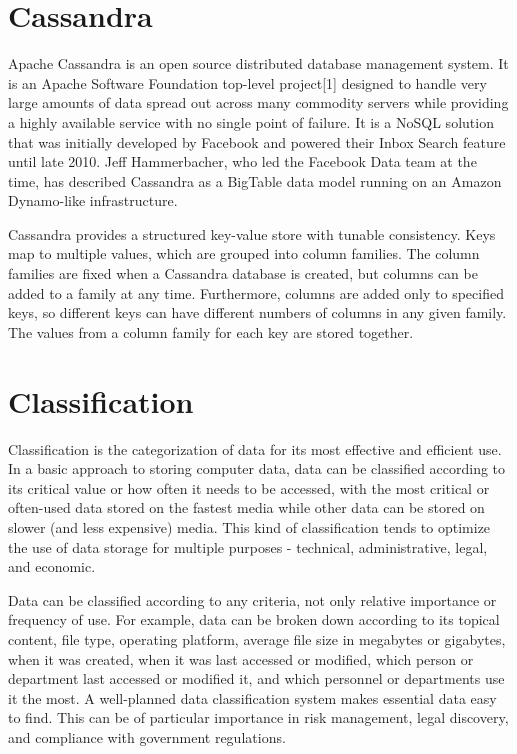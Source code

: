 \documentclass[11pt]{article} %
\begin{document}
\newpage


\newpage
\section{Cassandra}
Apache Cassandra is an open source distributed database management system. 
It is an Apache Software Foundation top-level project[1] designed to handle very 
large amounts of data spread out across many commodity servers while providing a highly 
available service with no single point of failure. It is a NoSQL solution that was initially 
developed by Facebook and powered their Inbox Search feature until late 2010.
Jeff Hammerbacher, who led the Facebook Data team at the time, has described 
Cassandra as a BigTable data model running on an Amazon Dynamo-like infrastructure.

Cassandra provides a structured key-value store with tunable consistency. 
Keys map to multiple values, which are grouped into column families. The column families are
 fixed when a Cassandra database is created, but columns can be added to a family at any time. 
Furthermore, columns are added only to specified keys, so different keys can have different 
numbers of columns in any given family. The values from a column family for each key are stored together.
\newpage

\section{Classification}

Classification is the categorization of data for its most effective and efficient use. In a basic approach to storing computer data, data can be classified according to its critical value or how often it needs to be accessed, with the most critical or often-used data stored on the fastest media while other data can be stored on slower (and less expensive) media. This kind of classification tends to optimize the use of data storage for multiple purposes - technical, administrative, legal, and economic.

Data can be classified according to any criteria, not only relative importance or frequency of use. For example, data can be broken down according to its topical content, file type, operating platform, average file size in megabytes or gigabytes, when it was created, when it was last accessed or modified, which person or department last accessed or modified it, and which personnel or departments use it the most. A well-planned data classification system makes essential data easy to find. This can be of particular importance in risk management, legal discovery, and compliance with government regulations.
\end{document}
